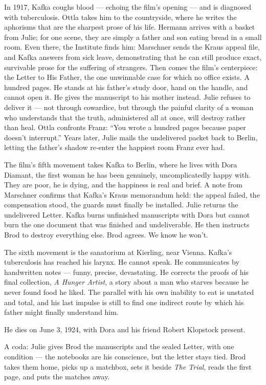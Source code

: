 In 1917, Kafka coughs blood --- echoing the film's opening --- and is diagnosed with tuberculosis. Ottla takes him to the countryside, where he writes the aphorisms that are the sharpest prose of his life. Hermann arrives with a basket from Julie; for one scene, they are simply a father and son eating bread in a small room. Even there, the Institute finds him: Marschner sends the Kraus appeal file, and Kafka answers from sick leave, demonstrating that he can still produce exact, survivable prose for the suffering of strangers. Then comes the film's centerpiece: the Letter to His Father, the one unwinnable case for which no office exists. A hundred pages. He stands at his father's study door, hand on the handle, and cannot open it. He gives the manuscript to his mother instead. Julie refuses to deliver it --- not through cowardice, but through the painful clarity of a woman who understands that the truth, administered all at once, will destroy rather than heal. Ottla confronts Franz: ``You wrote a hundred pages because paper doesn't interrupt.'' Years later, Julie mails the undelivered packet back to Berlin, letting the father's shadow re-enter the happiest room Franz ever had.

The film's fifth movement takes Kafka to Berlin, where he lives with Dora Diamant, the first woman he has been genuinely, uncomplicatedly happy with. They are poor, he is dying, and the happiness is real and brief. A note from Marschner confirms that Kafka's Kraus memorandum held: the appeal failed, the compensation stood, the guards must finally be installed. Julie returns the undelivered Letter. Kafka burns unfinished manuscripts with Dora but cannot burn the one document that was finished and undeliverable. He then instructs Brod to destroy everything else. Brod agrees. We know he won't.

The sixth movement is the sanatorium at Kierling, near Vienna. Kafka's tuberculosis has reached his larynx. He cannot speak. He communicates by handwritten notes --- funny, precise, devastating. He corrects the proofs of his final collection, \textit{A Hunger Artist}, a story about a man who starves because he never found food he liked. The parallel with his own inability to eat is unstated and total, and his last impulse is still to find one indirect route by which his father might finally understand him.

He dies on June 3, 1924, with Dora and his friend Robert Klopstock present.

A coda: Julie gives Brod the manuscripts and the sealed Letter, with one condition --- the notebooks are his conscience, but the letter stays tied. Brod takes them home, picks up a matchbox, sets it beside \textit{The Trial}, reads the first page, and puts the matches away.

